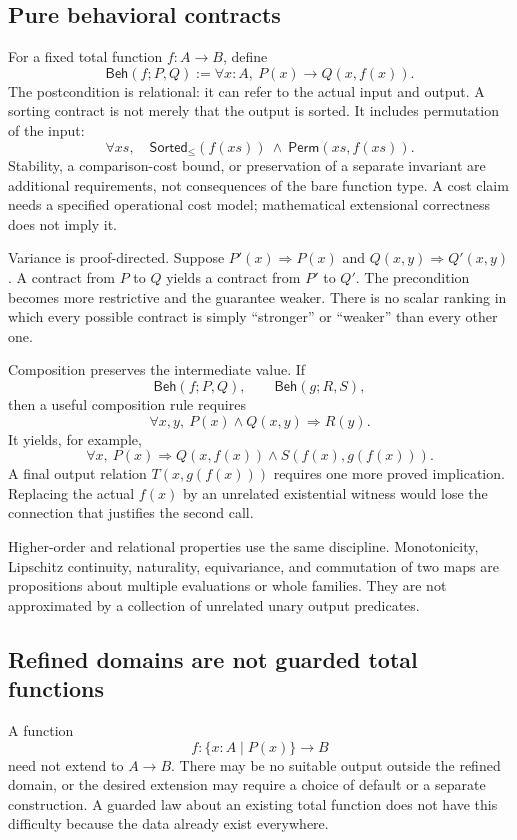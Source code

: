\documentclass[11pt,a4paper]{article}
\newcommand{\Beh}{\mathsf{Beh}}
\theoremstyle{definition}
\theoremstyle{remark}
\begin{document}
\subsection{Pure behavioral contracts}

For a fixed total function $f:A\to B$, define
\[
 \Beh(f;P,Q):=\forall x:A,\ P(x)\to Q(x,f(x)).
\]
The postcondition is relational: it can refer to the actual input and output.
A sorting contract is not merely that the output is sorted. It includes
permutation of the input:
\[
 \forall xs,\quad
 \mathsf{Sorted}_{\le}(f(xs))\ \land\
 \mathsf{Perm}(xs,f(xs)).
\]
Stability, a comparison-cost bound, or preservation of a separate invariant
are additional requirements, not consequences of the bare function type.
A cost claim needs a specified operational cost model; mathematical extensional
correctness does not imply it.

Variance is proof-directed. Suppose $P'(x)\Rightarrow P(x)$ and
$Q(x,y)\Rightarrow Q'(x,y)$. A contract from $P$ to $Q$ yields a contract
from $P'$ to $Q'$. The precondition becomes more restrictive and the guarantee
weaker. There is no scalar ranking in which every possible contract is simply
``stronger'' or ``weaker'' than every other one.

Composition preserves the intermediate value. If
\[
 \Beh(f;P,Q),\qquad \Beh(g;R,S),
\]
then a useful composition rule requires
\[
 \forall x,y,\ P(x)\land Q(x,y)\Rightarrow R(y).
\]
It yields, for example,
\[
 \forall x,\ P(x)\Rightarrow
 Q(x,f(x))\land S(f(x),g(f(x))).
\]
A final output relation $T(x,g(f(x)))$ requires one more proved implication.
Replacing the actual $f(x)$ by an unrelated existential witness would lose the
connection that justifies the second call.

Higher-order and relational properties use the same discipline. Monotonicity,
Lipschitz continuity, naturality, equivariance, and commutation of two maps are
propositions about multiple evaluations or whole families. They are not
approximated by a collection of unrelated unary output predicates.

\subsection{Refined domains are not guarded total functions}

A function
\[
 f:\{x:A\mid P(x)\}\to B
\]
need not extend to $A\to B$. There may be no suitable output outside the
refined domain, or the desired extension may require a choice of default or
a separate construction. A guarded law about an existing total function does
not have this difficulty because the data already exist everywhere.
\end{document}
